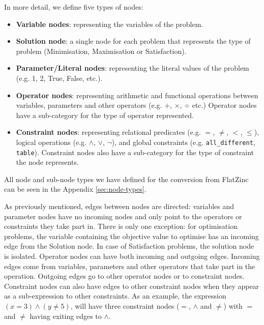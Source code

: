 In more detail, we define five types of nodes:
\begin{itemize}
    \item \textbf{Variable nodes}: representing the variables of the problem. 
    \item \textbf{Solution node}: a single node for each problem that represents the type of problem (Minimisation, Maximisation or Satisfaction).
    \item \textbf{Parameter/Literal nodes}: representing the literal values of the problem (e.g. 1, 2, True, False, etc.).
    \item \textbf{Operator nodes}: representing arithmetic and functional operations between variables, parameters and other operators (e.g. $+$, $\times$, $\div$ etc.) Operator nodes have a sub-category for the type of operator represented.
    \item \textbf{Constraint nodes}: representing relational predicates (e.g. $=$, $\neq$, $<$, $\leq$), logical operations (e.g. $\wedge$, $\vee$, $\neg$), and global constraints (e.g. \texttt{all\_different}, \texttt{table}). Constraint nodes also have a sub-category for the type of constraint the node represents. 
\end{itemize}
All node and sub-node types we have defined for the conversion from FlatZinc can be seen in the Appendix \ref{sec:node-types}.

As previously mentioned, edges between nodes are directed: variables and parameter nodes have no incoming nodes and only point to the operators or constraints they take part in. There is only one exception: for optimisation problems, the variable containing the objective value to optimise has an incoming edge from the Solution node. In case of Satisfaction problems, the solution node is isolated. Operator nodes can have both incoming and outgoing edges. Incoming edges come from variables, parameters and other operators that take part in the operation. Outgoing edges go to other operator nodes or to constraint nodes. Constraint nodes can also have edges to other constraint nodes when they appear as a sub-expression to other constraints. As an example, the expression $(x = 3) \wedge (y \neq 5)$, will have three constraint nodes ($=$, $\wedge$ and $\neq$) with $=$ and $\neq$ having exiting edges to $\wedge$.

